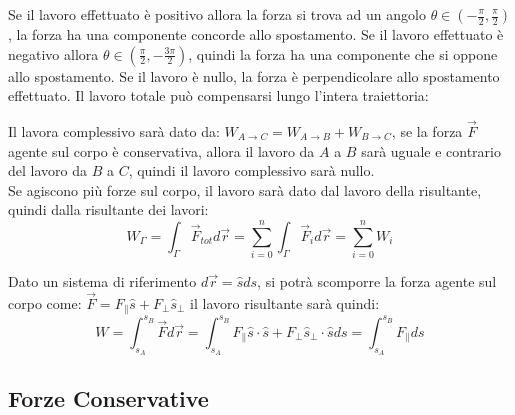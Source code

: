 \documentclass{article}
\numberwithin{equation}{subsection}
\begin{document}
Se il lavoro effettuato è positivo allora la forza si trova ad 
un angolo $\theta\in\left(-\displaystyle\frac{\pi}{2},\frac{\pi}{2}\right)$, 
la forza ha una componente concorde allo spostamento.
Se il lavoro effettuato è negativo allora $\theta\in\left(\displaystyle\frac{\pi}{2},-\frac{3\pi}{2}\right)$, 
quindi la forza ha una componente che si oppone allo spostamento.
Se il lavoro è nullo, la forza è perpendicolare allo spostamento 
effettuato. Il lavoro totale può compensarsi lungo l'intera 
traiettoria:
\begin{center}\end{center}
Il lavora complessivo sarà dato da: $W_{A\to C}=W_{A\to B}+W_{B\to C}$, 
se la forza $\vec{F}$ agente sul corpo è conservativa, allora il lavoro 
da $A$ a $B$ sarà uguale e contrario del lavoro da $B$ a $C$, 
quindi il lavoro complessivo sarà nullo.\\
Se agiscono più forze sul corpo, il lavoro sarà dato dal 
lavoro della risultante, quindi dalla risultante dei lavori:
\begin{equation}
    W_{\Gamma}=\displaystyle\int_{\Gamma}\vec{F}_{tot}d\vec{r}=\sum_{i=0}^{n}\int_{\Gamma}\vec{F}_id\vec{r}=\sum_{i=0}^{n}W_i
\end{equation}

Dato un sistema di riferimento $d\vec{r}=\hat{s}ds$, si potrà 
scomporre la forza agente sul corpo come: $\vec{F}=F_{\parallel}\hat{s}+F_{\perp}\hat{s}_{\perp}$ 
il lavoro risultante sarà quindi: 
\begin{equation}
    W=\int_{s_A}^{s_B}\vec{F}d\vec{r}=\int_{s_A}^{s_B}F_{\parallel}\hat{s}\cdot\hat{s}+F_{\perp}\hat{s}_{\perp}\cdot\hat{s}ds=\int_{s_A}^{s_B}F_{\parallel}ds
\end{equation}

\subsection{Forze Conservative}
\end{document}
